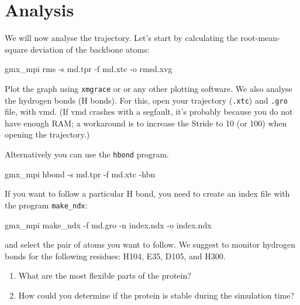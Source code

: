 \documentclass[10pt]{article}
\begin{document}
\section{Analysis}
We will now analyse the trajectory. Let's start by calculating the root-mean-square deviation of the backbone atoms:
\begin{cmdline}
gmx_mpi rms -s md.tpr -f md.xtc -o rmsd.xvg
\end{cmdline}

Plot the graph using \texttt{xmgrace} or  or any other plotting software. We also analyse the hydrogen bonds (H bonds). For this, open your trajectory (\texttt{.xtc}) and \texttt{.gro} file, with vmd. (If vmd crashes with a segfault, it's probably because you do not have enough RAM; a workaround is to increase the Stride to 10 (or 100) when opening the trajectory.)

Alternatively you can use the \texttt{hbond} program. 
\begin{cmdline}
gmx_mpi hbond -s md.tpr -f md.xtc -hbn
\end{cmdline}


If you want to follow a particular H bond, you need to create an index file with the program \texttt{make\_ndx}:

\begin{cmdline}
gmx_mpi make_ndx -f md.gro -n index.ndx -o index.ndx
\end{cmdline}

and select the pair of atoms you want to follow. We suggest to monitor hydrogen bonds for the following residues: H104, E35, D105, and H300. 

\begin{summary}
    \begin{enumerate}[leftmargin=0.8cm]
        \renewcommand{\labelenumi}{Q\arabic{enumi}.}
        \setcounter{enumi}{9}
        \item What are the most flexible parts of the protein?
        \item How could you determine if the protein is stable during the simulation time?
    \end{enumerate}
\end{summary}

\printbibliography
\end{document}

